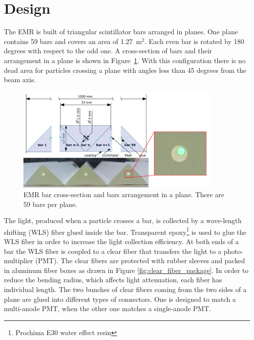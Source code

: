 \documentclass[a4paper,11pt]{article}
\begin{document}
\section{Design}
The EMR is built of triangular scintillator bars arranged in planes. 
One plane contains 59 bars and covers an area of 1.27~m$^2$. Each even bar is rotated by 180 degrees with respect to the odd one.
A cross-section of bars and their arrangement in a plane is shown in Figure~\ref{fig:bar_arrangement_in_a_plane}. With this
configuration there is no dead area for particles crossing a plane with angles less than 45 degrees from the beam axis.

\begin{figure}[htp!]
 \centering
 \includegraphics[width=0.9\textwidth]{./bar_arrangement_in_a_plane}
 \caption[EMR bar cross-section and plane arrangement]{EMR bar cross-section and bars arrangement in a plane. There are 59 bars per plane.}
 \label{fig:bar_arrangement_in_a_plane}
\end{figure}


The light, produced when a particle crosses a bar, is collected by a wave-length shifting (WLS) fiber glued inside the bar. 
Transparent epoxy\footnote{Prochima E30 water effect resin} is used to glue the WLS fiber in order to increase the light
collection efficiency. At both ends of a bar the WLS fiber is coupled to a clear fiber that transfers the light to a photo-multiplier
(PMT). The clear fibers are protected with rubber sleeves and packed in aluminum fiber boxes as drawn in Figure 
\ref{fig:clear_fiber_package}. In order to reduce the bending radius, which affects light attenuation, each fiber has individual
length. The two bunches of clear fibers coming from the two sides of a plane are glued into different types of connectors.
One is designed to match a multi-anode PMT, when the other one matches a single-anode PMT.
\end{document}
